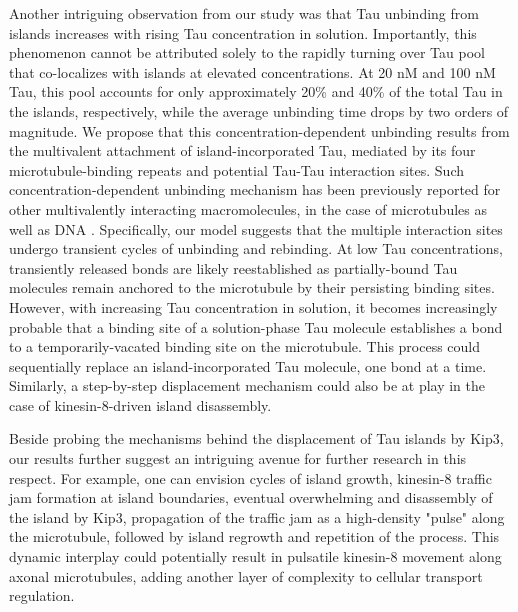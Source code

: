 Another intriguing observation from our study was that Tau unbinding from islands increases with rising Tau concentration in solution. Importantly, this phenomenon cannot be attributed solely to the rapidly turning over Tau pool that co-localizes with islands at elevated concentrations. At 20 nM and 100 nM Tau, this pool accounts for only approximately 20\% and 40\% of the total Tau in the islands, respectively, while the average unbinding time drops by two orders of magnitude. We propose that this concentration-dependent unbinding results from the multivalent attachment of island-incorporated Tau, mediated by its four microtubule-binding repeats and potential Tau-Tau interaction sites. Such concentration-dependent unbinding mechanism has been previously reported for other multivalently interacting macromolecules, in the case of microtubules as well as DNA \parencite{lanskydiffusible2015, sing2014multiple}. Specifically, our model suggests that the multiple interaction sites undergo transient cycles of unbinding and rebinding. At low Tau concentrations, transiently released bonds are likely reestablished as partially-bound Tau molecules remain anchored to the microtubule by their persisting binding sites. However, with increasing Tau concentration in solution, it becomes increasingly probable that a binding site of a solution-phase Tau molecule establishes a bond to a temporarily-vacated binding site on the microtubule. This process could sequentially replace an island-incorporated Tau molecule, one bond at a time. Similarly, a step-by-step displacement mechanism could also be at play in the case of kinesin-8-driven island disassembly.\par

Beside probing the mechanisms behind the displacement of Tau islands by Kip3, our results further suggest an intriguing avenue for further research in this respect. For example, one can envision cycles of island growth, kinesin-8 traffic jam formation at island boundaries, eventual overwhelming and disassembly of the island by Kip3, propagation of the traffic jam as a high-density "pulse" along the microtubule, followed by island regrowth and repetition of the process. This dynamic interplay could potentially result in pulsatile kinesin-8 movement along axonal microtubules, adding another layer of complexity to cellular transport regulation.\par


